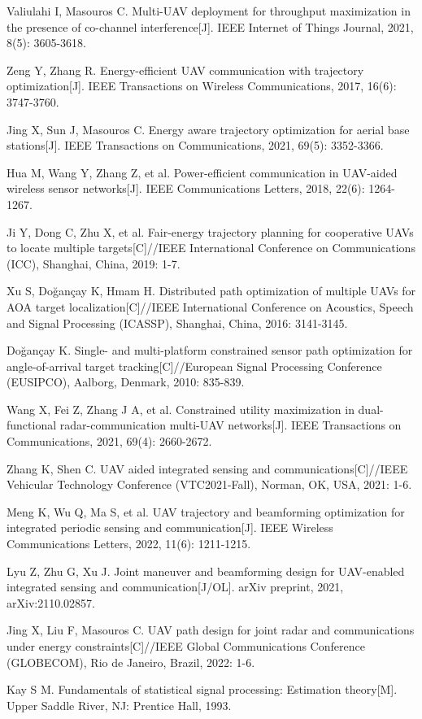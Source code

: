 \noindent
[24]\quad Valiulahi I, Masouros C. Multi-UAV deployment for throughput maximization in the presence of co-channel interference[J]. IEEE Internet of Things Journal, 2021, 8(5): 3605-3618.

\noindent
[25]\quad Zeng Y, Zhang R. Energy-efficient UAV communication with trajectory optimization[J]. IEEE Transactions on Wireless Communications, 2017, 16(6): 3747-3760.

\noindent
[26]\quad Jing X, Sun J, Masouros C. Energy aware trajectory optimization for aerial base stations[J]. IEEE Transactions on Communications, 2021, 69(5): 3352-3366.

\noindent
[27]\quad Hua M, Wang Y, Zhang Z, et al. Power-efficient communication in UAV-aided wireless sensor networks[J]. IEEE Communications Letters, 2018, 22(6): 1264-1267.

\noindent
[28]\quad Ji Y, Dong C, Zhu X, et al. Fair-energy trajectory planning for cooperative UAVs to locate multiple targets[C]//IEEE International Conference on Communications (ICC), Shanghai, China, 2019: 1-7.

\noindent
[29]\quad Xu S, Do\u{g}an\c{c}ay K, Hmam H. Distributed path optimization of multiple UAVs for AOA target localization[C]//IEEE International Conference on Acoustics, Speech and Signal Processing (ICASSP), Shanghai, China, 2016: 3141-3145.

\noindent
[30]\quad Do\u{g}an\c{c}ay K. Single- and multi-platform constrained sensor path optimization for angle-of-arrival target tracking[C]//European Signal Processing Conference (EUSIPCO), Aalborg, Denmark, 2010: 835-839.

\noindent
[31]\quad Wang X, Fei Z, Zhang J A, et al. Constrained utility maximization in dual-functional radar-communication multi-UAV networks[J]. IEEE Transactions on Communications, 2021, 69(4): 2660-2672.

\noindent
[32]\quad Zhang K, Shen C. UAV aided integrated sensing and communications[C]//IEEE Vehicular Technology Conference (VTC2021-Fall), Norman, OK, USA, 2021: 1-6.

\noindent
[33]\quad Meng K, Wu Q, Ma S, et al. UAV trajectory and beamforming optimization for integrated periodic sensing and communication[J]. IEEE Wireless Communications Letters, 2022, 11(6): 1211-1215.

\noindent
[34]\quad Lyu Z, Zhu G, Xu J. Joint maneuver and beamforming design for UAV-enabled integrated sensing and communication[J/OL]. arXiv preprint, 2021, arXiv:2110.02857.

\noindent
[35]\quad Jing X, Liu F, Masouros C. UAV path design for joint radar and communications under energy constraints[C]//IEEE Global Communications Conference (GLOBECOM), Rio de Janeiro, Brazil, 2022: 1-6.

\noindent
[36]\quad Kay S M. Fundamentals of statistical signal processing: Estimation theory[M]. Upper Saddle River, NJ: Prentice Hall, 1993.
